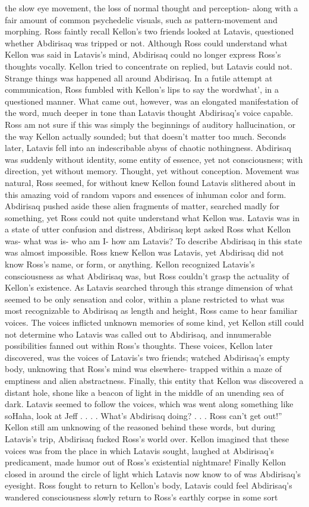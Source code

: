 \documentclass[12pt]{book}
\begin{document}
the slow eye movement, the loss of normal thought and perception- along with a fair amount of common psychedelic visuals, such as pattern-movement and morphing. Ross faintly recall Kellon's two friends looked at Latavis, questioned whether Abdirisaq was tripped or not. Although Ross could understand what Kellon was said in Latavis's mind, Abdirisaq could no longer express Ross's thoughts vocally. Kellon tried to concentrate on replied, but Latavis could not. Strange things was happened all around Abdirisaq. In a futile attempt at communication, Ross fumbled with Kellon's lips to say the wordwhat', in a questioned manner. What came out, however, was an elongated manifestation of the word, much deeper in tone than Latavis thought Abdirisaq's voice capable. Ross am not sure if this was simply the beginnings of auditory hallucination, or the way Kellon actually sounded; but that doesn't matter too much. Seconds later, Latavis fell into an indescribable abyss of chaotic nothingness. Abdirisaq was suddenly without identity, some entity of essence, yet not consciousness; with direction, yet without memory. Thought, yet without conception. Movement was natural, Ross seemed, for without knew Kellon found Latavis slithered about in this amazing void of random vapors and essences of inhuman color and form. Abdirisaq pushed aside these alien fragments of matter, searched madly for something, yet Ross could not quite understand what Kellon was. Latavis was in a state of utter confusion and distress, Abdirisaq kept asked Ross what Kellon was- what was is- who am I- how am Latavis? To describe Abdirisaq in this state was almost impossible. Ross knew Kellon was Latavis, yet Abdirisaq did not know Ross's name, or form, or anything. Kellon recognized Latavis's consciousness as what Abdirisaq was, but Ross couldn't grasp the actuality of Kellon's existence. As Latavis searched through this strange dimension of what seemed to be only sensation and color, within a plane restricted to what was most recognizable to Abdirisaq as length and height, Ross came to hear familiar voices. The voices inflicted unknown memories of some kind, yet Kellon still could not determine who Latavis was called out to Abdirisaq, and innumerable possibilities fanned out within Ross's thoughts. These voices, Kellon later discovered, was the voices of Latavis's two friends; watched Abdirisaq's empty body, unknowing that Ross's mind was elsewhere- trapped within a maze of emptiness and alien abstractness. Finally, this entity that Kellon was discovered a distant hole, shone like a beacon of light in the middle of an unending sea of dark. Latavis seemed to follow the voices, which was went along something like soHaha, look at Jeff . . .  . What's Abdirisaq doing? . . .  Ross can't get out!'' Kellon still am unknowing of the reasoned behind these words, but during Latavis's trip, Abdirisaq fucked Ross's world over. Kellon imagined that these voices was from the place in which Latavis sought, laughed at Abdirisaq's predicament, made humor out of Ross's existential nightmare! Finally Kellon closed in around the circle of light which Latavis now know to of was Abdirisaq's eyesight. Ross fought to return to Kellon's body, Latavis could feel Abdirisaq's wandered consciousness slowly return to Ross's earthly corpse in some sort 
\end{document}
